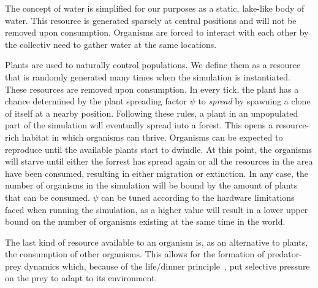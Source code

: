 The concept of water is simplified for our purposes as a static, lake-like body of water.
This resource is generated sparsely at central positions and will not be removed upon consumption.
Organisms are forced to interact with each other by the collectiv need to gather water at the same locations.

Plants are used to naturally control populations. We define them as a resource that is randomly generated
many times when the simulation is instantiated. These resources are removed upon consumption. In every tick, 
the plant has a chance determined by the plant spreading factor \(\psi \) to \emph{spread} by spawning a clone of itself
at a nearby position. Following these rules, a plant in an unpopulated part of the simulation will eventually spread 
into a forest.
This opens a resource-rich habitat in which organisms can thrive. Organisms can be expected to 
reproduce until the available plants start to dwindle. At this point, the organisms will starve until either 
the forrest has spread again or all the resources in the area have been consumed, resulting in either
migration or extinction. In any case, the number of organisms in the simulation will be bound by the amount of 
plants that can be consumed. 
\(\psi \) can be tuned according to the hardware limitations faced when running the simulation, as a higher value
will result in a lower upper bound on the number of organisms existing at the same time in the world.

The last kind of resource available to an organism is, as an alternative to plants, the consumption of 
other organisms. This allows for the formation of predator-prey dynamics which, 
because of the life/dinner principle~\cite{Dawkins1982}, put selective pressure on the prey to adapt to its 
environment.
